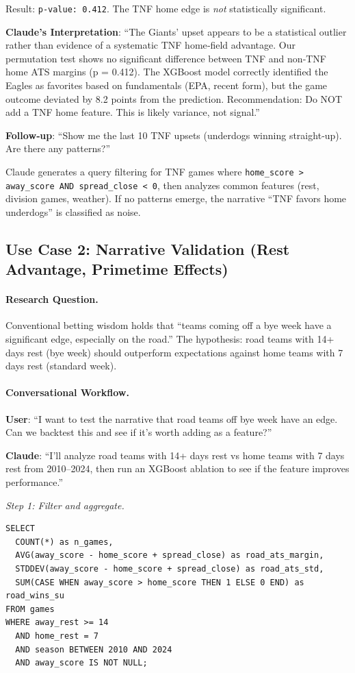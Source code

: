 Result: \texttt{p-value: 0.412}. The TNF home edge is \textit{not} statistically significant.

\textbf{Claude's Interpretation}: ``The Giants' upset appears to be a statistical outlier rather than evidence of a systematic TNF home‑field advantage. Our permutation test shows no significant difference between TNF and non‑TNF home ATS margins (p = 0.412). The XGBoost model correctly identified the Eagles as favorites based on fundamentals (EPA, recent form), but the game outcome deviated by 8.2 points from the prediction. Recommendation: Do NOT add a TNF home feature. This is likely variance, not signal.''

\textbf{Follow‑up}: ``Show me the last 10 TNF upsets (underdogs winning straight‑up). Are there any patterns?''

Claude generates a query filtering for TNF games where \texttt{home\_score > away\_score AND spread\_close < 0}, then analyzes common features (rest, division games, weather). If no patterns emerge, the narrative ``TNF favors home underdogs'' is classified as noise.

\subsection{Use Case 2: Narrative Validation (Rest Advantage, Primetime Effects)}
\label{subsec:use_case_narrative}

\paragraph{Research Question.}
Conventional betting wisdom holds that ``teams coming off a bye week have a significant edge, especially on the road.'' The hypothesis: road teams with 14+ days rest (bye week) should outperform expectations against home teams with 7 days rest (standard week).

\paragraph{Conversational Workflow.}
\textbf{User}: ``I want to test the narrative that road teams off bye week have an edge. Can we backtest this and see if it's worth adding as a feature?''

\textbf{Claude}: ``I'll analyze road teams with 14+ days rest vs home teams with 7 days rest from 2010--2024, then run an XGBoost ablation to see if the feature improves performance.''

\textit{Step 1: Filter and aggregate.}
\begin{verbatim}
SELECT
  COUNT(*) as n_games,
  AVG(away_score - home_score + spread_close) as road_ats_margin,
  STDDEV(away_score - home_score + spread_close) as road_ats_std,
  SUM(CASE WHEN away_score > home_score THEN 1 ELSE 0 END) as road_wins_su
FROM games
WHERE away_rest >= 14
  AND home_rest = 7
  AND season BETWEEN 2010 AND 2024
  AND away_score IS NOT NULL;
\end{verbatim}

